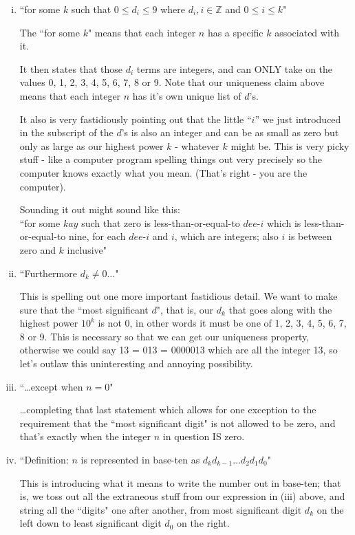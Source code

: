 \documentclass{article}
\begin{document}
\begin{enumerate}[i)]
\item ``for some $k$ such that $0 \le d_i \le 9$ where $d_i,i\in\mathbb{Z}$ and $0 \le i \le k$"

The ``for some $k$" means that each integer $n$ has a specific $k$ associated with it.

It then states that those $d_i$ terms are integers,
and can ONLY take on the values 0, 1, 2, 3, 4, 5, 6, 7, 8 or 9.
Note that our uniqueness claim above means that each
integer $n$ has it's own unique list of $d$'s.

It also is very fastidiously pointing out that the little ``$i$'' we just introduced
in the subscript of the $d$'s is also an integer and can be as small as zero but
only as large as our highest power $k$ - whatever $k$ might be.
This is very picky stuff - like a computer program spelling things out
very precisely so the computer knows exactly what you mean.
(That's right - you are the computer).

Sounding it out might sound like this:\\
``for some $kay$ such that zero is less-than-or-equal-to $dee$-$i$
which is less-than-or-equal-to nine, for each $dee$-$i$ and $i$,
which are integers; also $i$ is between zero and $k$ inclusive"

\item ``Furthermore $d_k\ne0\dots{}$"

This is spelling out one more important fastidious detail.
We want to make sure that the ``most significant $d$", that is,
our $d_k$ that goes along with the highest power $10^k$ is not 0,
in other words it must be one of 1, 2, 3, 4, 5, 6, 7, 8 or 9.
This is necessary so that we can get our uniqueness property,
otherwise we could say 13 = 013 = 0000013 which are all the integer 13,
so let's outlaw this uninteresting and annoying possibility.

\item ``\dots{}except when $n=0$"

\dots{}completing that last statement which allows for
one exception to the requirement that the ``most significant digit"
is not allowed to be zero, and that's exactly when the
integer $n$ in question IS zero.

\item ``Definition: $n$ is represented in base-ten as $d_kd_{k-1}\dots{}d_2d_1d_0$"

This is introducing what it means to write the number out in base-ten; that is,
we toss out all the extraneous stuff from our expression in (iii) above,
and string all the ``digits" one after another,
from most significant digit $d_k$ on the left down to least
significant digit $d_0$ on the right.
\end{enumerate}
\end{document}
